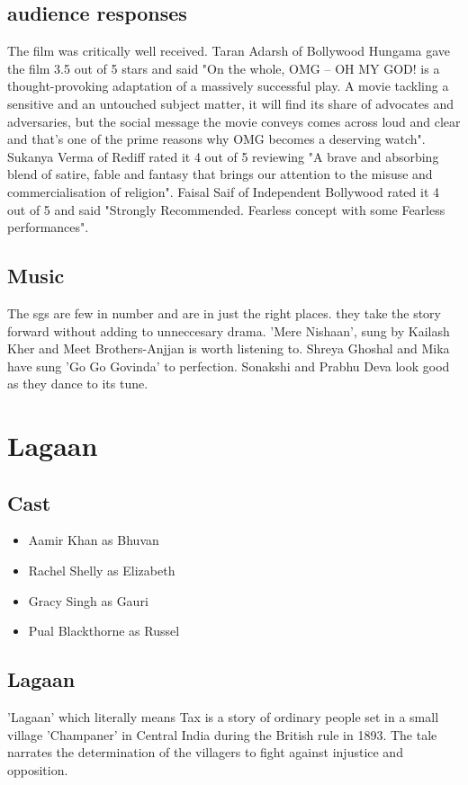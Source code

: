 \documentclass[a4paper]{article}
\begin{document}
	\subsection{audience responses}

	The film was critically well received.
Taran Adarsh of Bollywood Hungama gave the film 3.5 out of 5 stars and said "On the whole, OMG – OH MY GOD! is a thought-provoking adaptation of a massively successful play. A movie tackling a sensitive and an untouched subject matter, it will find its share of advocates and adversaries, but the social message the movie conveys comes across loud and clear and that's one of the prime reasons why OMG becomes a deserving watch". Sukanya Verma of Rediff rated it 4 out of 5 reviewing "A brave and absorbing blend of satire, fable and fantasy that brings our attention to the misuse and commercialisation of religion". Faisal Saif of Independent Bollywood rated it 4 out of 5 and said "Strongly Recommended. Fearless concept with some Fearless performances".   	        
	                  
\subsection{Music }
The sgs are few in number and are in just the right places. they take the story forward without adding to unneccesary drama. 'Mere Nishaan', sung by Kailash Kher and Meet Brothers-Anjjan is worth listening to. Shreya Ghoshal and Mika have sung 'Go Go Govinda' to perfection. Sonakshi and Prabhu Deva look good as they dance to its tune. 

	   
	
	   
	
	

	  \section{Lagaan }
	  \subsection {Cast}
	  \begin{itemize}
\item Aamir Khan as Bhuvan
\item Rachel Shelly as Elizabeth
\item Gracy Singh as Gauri
\item Pual Blackthorne as Russel
\end{itemize}
	  \subsection{Lagaan }
	  'Lagaan' which literally means Tax is a story of ordinary people set in a small village 'Champaner' in Central India during the British rule in 1893. The tale narrates the determination of the villagers to fight against injustice and opposition.
	  
\end{document}
